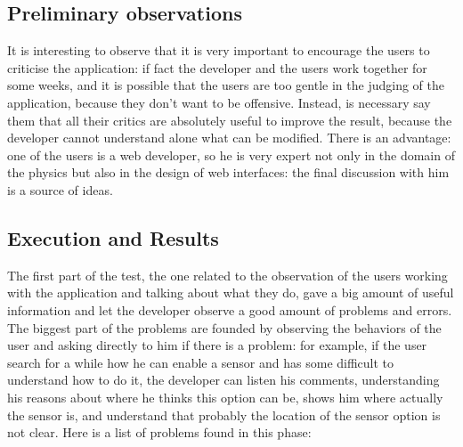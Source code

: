 \subsection{Preliminary observations}
It is interesting to observe that it is very important to encourage the users to criticise the application: if fact the developer and the users work together for some weeks, and it is possible that the users are too gentle in the judging of the application, because they don't want to be offensive. Instead, is necessary say them that all their critics are absolutely useful to improve the result, because the developer cannot understand alone what can be modified. 
There is an advantage: one of the users is a web developer, so he is very expert not only in the domain of the physics but also in the design of web interfaces: the final discussion with him is a source of ideas.  

\subsection{Execution and Results}
The first part of the test, the one related to the observation of the users working with the application and talking about what they do, gave a big amount of useful information and let the developer observe a good amount of problems and errors. 
The biggest part of the problems are founded by observing the behaviors of the user and asking directly to him if there is a problem: for example, if the user search for a while how he can enable a sensor and has some difficult to understand how to do it, the developer can listen his comments, understanding his reasons about where he thinks this option can be, shows him where actually the sensor is, and understand that probably the location of the sensor option is not clear. 
Here is a list of problems found in this phase:

